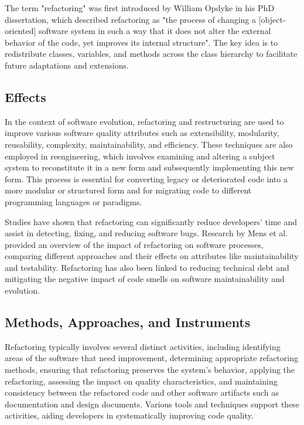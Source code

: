 The term "refactoring" was first introduced by William Opdyke in his PhD dissertation, which described refactoring as "the process of changing a [object-oriented] software system in such a way that it does not alter the external behavior of the code, yet improves its internal structure". The key idea is to redistribute classes, variables, and methods across the class hierarchy to facilitate future adaptations and extensions.

\subsection{Effects}
In the context of software evolution, refactoring and restructuring are used to improve various software quality attributes such as extensibility, modularity, reusability, complexity, maintainability, and efficiency. These techniques are also employed in reengineering, which involves examining and altering a subject system to reconstitute it in a new form and subsequently implementing this new form. This process is essential for converting legacy or deteriorated code into a more modular or structured form  and for migrating code to different programming languages or paradigms.

Studies have shown that refactoring can significantly reduce developers' time and assist in detecting, fixing, and reducing software bugs. Research by Mens et al. provided an overview of the impact of refactoring on software processes, comparing different approaches and their effects on attributes like maintainability and testability. Refactoring has also been linked to reducing technical debt and mitigating the negative impact of code smells on software maintainability and evolution.

\subsection{Methods, Approaches, and Instruments}
Refactoring typically involves several distinct activities, including identifying areas of the software that need improvement, determining appropriate refactoring methods, ensuring that refactoring preserves the system's behavior, applying the refactoring, assessing the impact on quality characteristics, and maintaining consistency between the refactored code and other software artifacts such as documentation and design documents. Various tools and techniques support these activities, aiding developers in systematically improving code quality.

